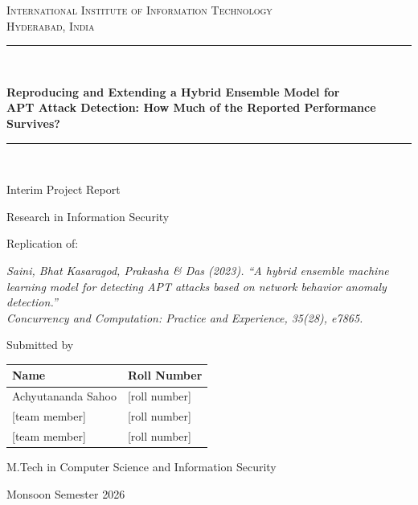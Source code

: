 \documentclass[11pt,a4paper]{article}
\begin{document}
\begin{titlepage}
\centering
{\scshape\LARGE International Institute of Information Technology\\[4pt] Hyderabad, India\par}
\vspace{1.6cm}
\rule{\linewidth}{0.6pt}\\[10pt]
{\Large\bfseries Reproducing and Extending a Hybrid Ensemble Model for\\[4pt]
APT Attack Detection: How Much of the Reported Performance Survives?\par}
\rule{\linewidth}{0.6pt}\\[18pt]
{\large Interim Project Report\par}
\vspace{6pt}
{\large Research in Information Security\par}
\vspace{1.4cm}
{\large Replication of:\par}
\vspace{4pt}
{\itshape Saini, Bhat Kasaragod, Prakasha \& Das (2023). ``A hybrid ensemble machine learning model for
detecting APT attacks based on network behavior anomaly detection.''\\
Concurrency and Computation: Practice and Experience, 35(28), e7865.\par}
\vspace{1.8cm}
{\large Submitted by\par}
\vspace{6pt}
\begin{tabular}{ll}
\toprule
Name & Roll Number \\
\midrule
Achyutananda Sahoo & [roll number] \\
{[team member]} & [roll number] \\
{[team member]} & [roll number] \\
\bottomrule
\end{tabular}
\vfill
{\large M.Tech in Computer Science and Information Security\par}
\vspace{4pt}
{\large Monsoon Semester 2026\par}
\end{titlepage}

\tableofcontents
\newpage
\end{document}
